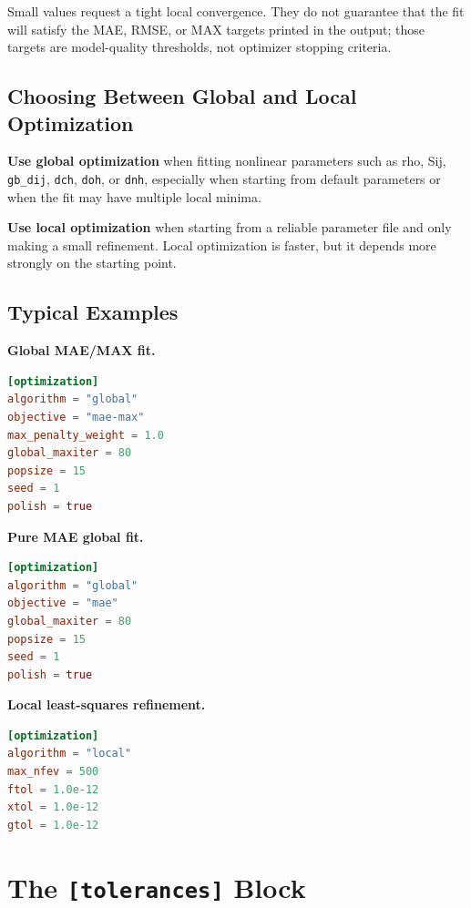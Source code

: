 \documentclass[11pt]{article}
\begin{document}
Small values request a tight local convergence. They do not guarantee that the
fit will satisfy the MAE, RMSE, or MAX targets printed in the output; those
targets are model-quality thresholds, not optimizer stopping criteria.

\subsection{Choosing Between Global and Local Optimization}

\textbf{Use global optimization} when fitting nonlinear parameters such as rho,
Sij, \texttt{gb\_dij}, \texttt{dch}, \texttt{doh}, or \texttt{dnh}, especially
when starting from default parameters or when the fit may have multiple local
minima.

\textbf{Use local optimization} when starting from a reliable parameter file and
only making a small refinement. Local optimization is faster, but it depends
more strongly on the starting point.

\subsection{Typical Examples}

\textbf{Global MAE/MAX fit.}

\begin{lstlisting}[language=toml]
[optimization]
algorithm = "global"
objective = "mae-max"
max_penalty_weight = 1.0
global_maxiter = 80
popsize = 15
seed = 1
polish = true
\end{lstlisting}

\textbf{Pure MAE global fit.}

\begin{lstlisting}[language=toml]
[optimization]
algorithm = "global"
objective = "mae"
global_maxiter = 80
popsize = 15
seed = 1
polish = true
\end{lstlisting}

\textbf{Local least-squares refinement.}

\begin{lstlisting}[language=toml]
[optimization]
algorithm = "local"
max_nfev = 500
ftol = 1.0e-12
xtol = 1.0e-12
gtol = 1.0e-12
\end{lstlisting}

\section{The \texttt{[tolerances]} Block}
\end{document}
